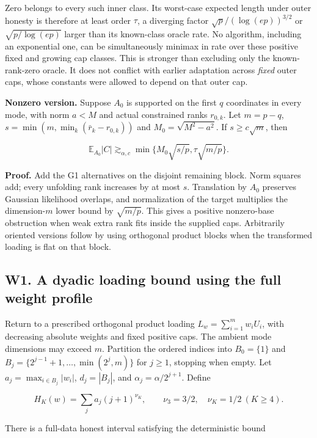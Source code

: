 Zero belongs to every such inner class. Its worst-case expected length
under outer honesty is therefore at least order \(\tau\), a diverging
factor \(\sqrt p/(\log(ep))^{3/2}\) or \(\sqrt{p/\log(ep)}\) larger than
its known-class oracle rate. No algorithm, including an exponential one,
can be simultaneously minimax in rate over these positive fixed and
growing cap classes. This is stronger than excluding only the
known-rank-zero oracle. It does not conflict with earlier adaptation
across \emph{fixed} outer caps, whose constants were allowed to depend
on that outer cap.

\textbf{Nonzero version.} Suppose \(A_0\) is supported on the first
\(q\) coordinates in every mode, with norm \(a<M\) and actual
constrained ranks \(r_{0,k}\). Let \(m=p-q\),
\(s=\min(m,\min_k(\bar r_k-r_{0,k}))\) and \(M_0=\sqrt{M^2-a^2}\). If
\(s\ge c\sqrt m\), then

\[\mathbb E_{A_0}|C|\gtrsim_{\alpha,c}
\min\{M_0\sqrt{s/p},\tau\sqrt{m/p}\}.\]

\textbf{Proof.} Add the G1 alternatives on the disjoint remaining block.
Norm squares add; every unfolding rank increases by at most \(s\).
Translation by \(A_0\) preserves Gaussian likelihood overlaps, and
normalization of the target multiplies the dimension-\(m\) lower bound
by \(\sqrt{m/p}\). This gives a positive nonzero-base obstruction when
weak extra rank fits inside the supplied caps. Arbitrarily oriented
versions follow by using orthogonal product blocks when the transformed
loading is flat on that block.

\subsection{W1. A dyadic loading bound using the full weight
profile}\label{w1.-a-dyadic-loading-bound-using-the-full-weight-profile}\label{sup:W1}

Return to a prescribed orthogonal product loading
\(L_w=\sum_{i=1}^m w_i U_i\), with decreasing absolute weights and fixed
positive caps. The ambient mode dimensions may exceed \(m\). Partition
the ordered indices into \(B_0=\{1\}\) and
\(B_j=\{2^{j-1}+1,\ldots,\min(2^j,m)\}\) for \(j\ge1\), stopping when
empty. Let \(a_j=\max_{i\in B_j}|w_i|\), \(d_j=|B_j|\), and
\(\alpha_j=\alpha/2^{j+1}\). Define

\[H_K(w)=\sum_j a_j(j+1)^{\nu_K},\qquad
\nu_3=3/2,\quad \nu_K=1/2\ (K\ge4).\]

There is a full-data honest interval satisfying the deterministic bound

